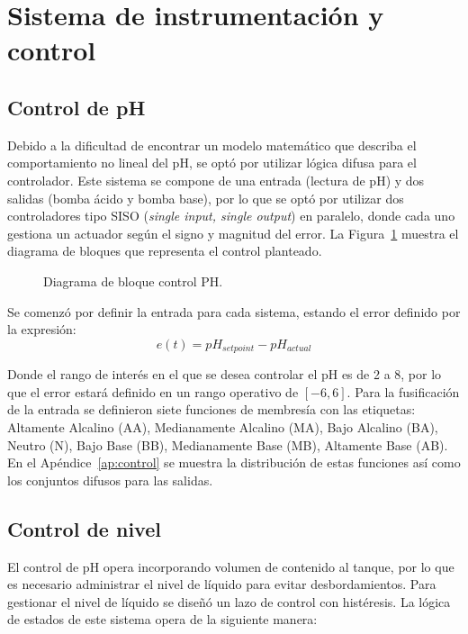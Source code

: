 \documentclass[11pt,tesis,twoside,openright,spanish]{upiiztt}
\begin{document}
\section{Sistema de instrumentación y control}

\subsection{Control de pH}

Debido a la dificultad de encontrar un modelo matemático que describa el
comportamiento no lineal del pH, se optó por utilizar lógica difusa para el
controlador. Este sistema se compone de una entrada (lectura de pH) y dos salidas
(bomba ácido y bomba base), por lo que se optó por utilizar dos controladores tipo
SISO (\textit{single input, single output}) en paralelo, donde cada uno gestiona un
actuador según el signo y magnitud del error. La Figura~\ref{fig:control_ph} muestra el diagrama de
bloques que representa el control planteado.

\begin{figure}[H]
  \centering
  \caption{Diagrama de bloque control PH.}
  \label{fig:control_ph}
\end{figure}

Se comenzó por definir la entrada para cada sistema, estando el error definido por
la expresión:
\begin{equation}
e(t) = pH_{setpoint} - pH_{actual}
\end{equation}

Donde el rango de interés en el que se desea controlar el pH es de 2 a 8, por lo
que el error estará definido en un rango operativo de $[-6, 6]$. Para la fusificación de
la entrada se definieron siete funciones de membresía con las etiquetas: Altamente
Alcalino (AA), Medianamente Alcalino (MA), Bajo Alcalino (BA), Neutro (N), Bajo
Base (BB), Medianamente Base (MB), Altamente Base (AB). En el Apéndice~\ref{ap:control}
se muestra la distribución de estas funciones así como los conjuntos difusos para
las salidas.

\subsection{Control de nivel}

El control de pH opera incorporando volumen de contenido al tanque, por lo que es
necesario administrar el nivel de líquido para evitar desbordamientos. Para
gestionar el nivel de líquido se diseñó un lazo de control con histéresis. La lógica
de estados de este sistema opera de la siguiente manera:
\end{document}
